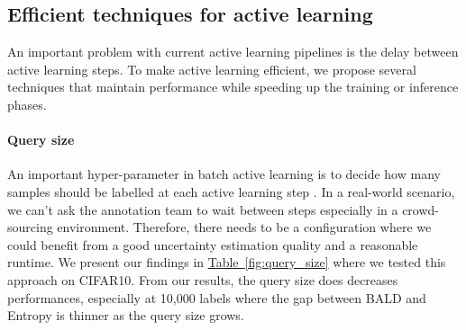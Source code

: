 \documentclass{article}
\newcommand{\tabref}[1]{\hyperref[#1]{Table\ \ref*{#1}}}
\begin{document}
\subsection{Efficient techniques for active learning}\label{techniques}

An important problem with current active learning pipelines is the delay between active learning steps. %
To make active learning efficient, we propose several techniques that maintain performance while speeding up the training or inference phases.

\paragraph{Query size}
An important hyper-parameter in batch active learning is to decide how many samples should be labelled at each active learning step \citep{gal2017deep, tsymbalov2019deeper}. %
In a real-world scenario, we can't ask the annotation team to wait between steps especially in a crowd-sourcing environment. %
Therefore, there needs to be a configuration where we could benefit from a good uncertainty estimation quality and a reasonable runtime. We present our findings in \tabref{fig:query_size} where we tested this approach on CIFAR10. 
From our results, the query size does decreases performances, especially at 10,000 labels where the gap between BALD and Entropy is thinner as the query size grows.
\end{document}
